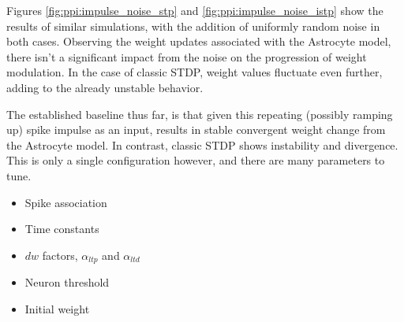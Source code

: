 
Figures \ref{fig:ppi:impulse_noise_stp} and \ref{fig:ppi:impulse_noise_istp}
show the results of similar simulations, with the addition of uniformly random
noise in both cases. Observing the weight updates associated with the Astrocyte
model, there isn't a significant impact from the noise on the progression of
weight modulation. In the case of classic STDP, weight values fluctuate even
further, adding to the already unstable behavior.



The established baseline thus far, is that given this repeating (possibly
ramping up) spike impulse as an input, results in stable convergent weight
change from the Astrocyte model. In contrast, classic STDP shows instability and
divergence. This is only a single configuration however, and there are many
parameters to tune.
\begin{itemize}
\item Spike association
\item Time constants
\item $dw$ factors, $\alpha_{ltp}$ and $\alpha_{ltd}$
\item Neuron threshold
\item Initial weight
\end{itemize}

